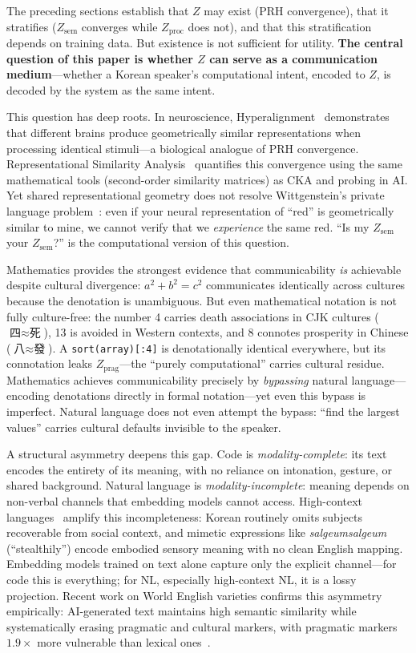 \documentclass{article}
\theoremstyle{definition}
\newcommand{\Zsem}{Z_{\text{sem}}}
\newcommand{\Zproc}{Z_{\text{proc}}}
\newcommand{\Zprag}{Z_{\text{prag}}}
\begin{document}
The preceding sections establish that $Z$ may exist (PRH convergence), that it stratifies ($\Zsem$ converges while $\Zproc$ does not), and that this stratification depends on training data. But existence is not sufficient for utility. \textbf{The central question of this paper is whether $Z$ can serve as a communication medium}---whether a Korean speaker's computational intent, encoded to $Z$, is decoded by the system as the same intent.

This question has deep roots. In neuroscience, Hyperalignment~\citep{haxby2011hyperalignment} demonstrates that different brains produce geometrically similar representations when processing identical stimuli---a biological analogue of PRH convergence. Representational Similarity Analysis~\citep{kriegeskorte2008rsa} quantifies this convergence using the same mathematical tools (second-order similarity matrices) as CKA and probing in AI. Yet shared representational geometry does not resolve Wittgenstein's private language problem~\citep{wittgenstein1953}: even if your neural representation of ``red'' is geometrically similar to mine, we cannot verify that we \emph{experience} the same red. ``Is my $\Zsem$ your $\Zsem$?'' is the computational version of this question.

Mathematics provides the strongest evidence that communicability \emph{is} achievable despite cultural divergence: $a^2 + b^2 = c^2$ communicates identically across cultures because the denotation is unambiguous. But even mathematical notation is not fully culture-free: the number 4 carries death associations in CJK cultures ($\text{四} \approx \text{死}$), 13 is avoided in Western contexts, and 8 connotes prosperity in Chinese ($\text{八} \approx \text{發}$). A \texttt{sort(array)[:4]} is denotationally identical everywhere, but its connotation leaks $\Zprag$---the ``purely computational'' carries cultural residue. Mathematics achieves communicability precisely by \emph{bypassing} natural language---encoding denotations directly in formal notation---yet even this bypass is imperfect. Natural language does not even attempt the bypass: ``find the largest values'' carries cultural defaults invisible to the speaker.

A structural asymmetry deepens this gap. Code is \emph{modality-complete}: its text encodes the entirety of its meaning, with no reliance on intonation, gesture, or shared background. Natural language is \emph{modality-incomplete}: meaning depends on non-verbal channels that embedding models cannot access. High-context languages~\citep{hall1976beyond} amplify this incompleteness: Korean routinely omits subjects recoverable from social context, and mimetic expressions like \emph{salgeumsalgeum} (``stealthily'') encode embodied sensory meaning with no clean English mapping. Embedding models trained on text alone capture only the explicit channel---for code this is everything; for NL, especially high-context NL, it is a lossy projection. Recent work on World English varieties confirms this asymmetry empirically: AI-generated text maintains high semantic similarity while systematically erasing pragmatic and cultural markers, with pragmatic markers $1.9\times$ more vulnerable than lexical ones~\citep{culturalghosting2026}.
\end{document}
